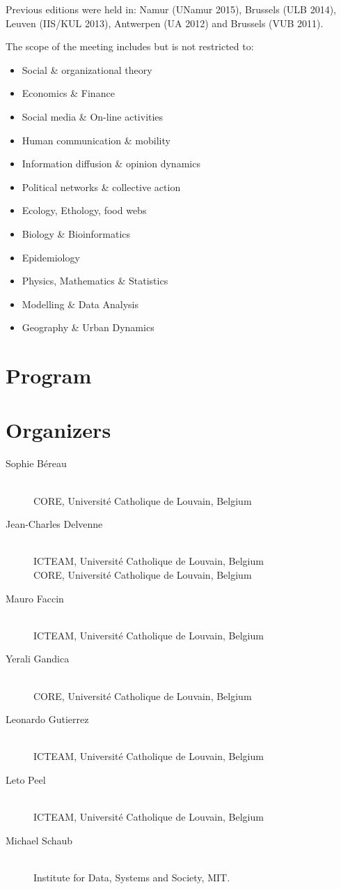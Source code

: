 \documentclass[11pt, a4paper, openany]{scrbook}
\begin{document}
Previous editions were held in:
Namur (UNamur 2015),
Brussels (ULB 2014),
Leuven (IIS/KUL 2013),
Antwerpen (UA 2012) and
Brussels (VUB 2011).

The scope of the meeting includes but is not restricted to:

\begin{itemize}
  \item  Social \& organizational theory
  \item  Economics \& Finance
  \item  Social media \& On-line activities
  \item  Human communication \& mobility
  \item  Information diffusion \& opinion dynamics
  \item  Political networks \& collective action
  \item  Ecology, Ethology, food webs
  \item  Biology \& Bioinformatics
  \item  Epidemiology
  \item  Physics, Mathematics \& Statistics
  \item  Modelling \& Data Analysis
  \item  Geography \& Urban Dynamics
\end{itemize}

\newpage

\section*{Program}

\makebox[\textwidth][r]{}

\section*{Organizers}

\newcommand{\icteam}{ICTEAM, Université Catholique de Louvain, Belgium}
\newcommand{\core}{CORE, Université Catholique de Louvain, Belgium}
\begin{description}
  \item[Sophie Béreau]\ \\
    \core%
  \item[Jean-Charles Delvenne]\ \\
    \icteam\\
    \core%
  \item[Mauro Faccin]\ \\
    \icteam%
  \item[Yerali Gandica]\ \\
    \core%
  \item[Leonardo Gutierrez]\ \\
    \icteam%
  \item[Leto Peel]\ \\
    \icteam%
  \item[Michael Schaub]\ \\
    Institute for Data, Systems and Society, MIT.
\end{description}
\end{document}
